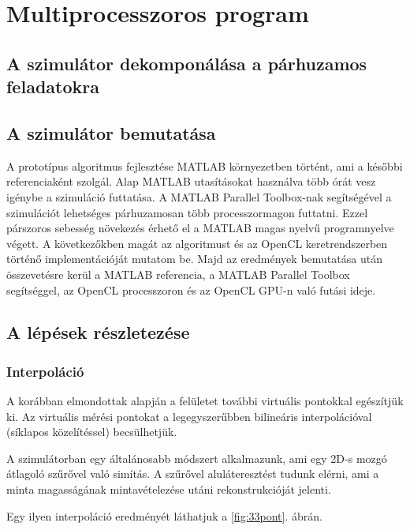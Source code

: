 \chapter{Multiprocesszoros program}
\section{A szimulátor dekomponálása a párhuzamos feladatokra}

\section{A szimulátor bemutatása} 
	 A prototípus algoritmus fejlesztése MATLAB környezetben történt, ami a későbbi referenciaként szolgál.
	 Alap MATLAB utasításokat használva több órát vesz igénybe a szimuláció futtatása.
	 A MATLAB Parallel Toolbox-nak segítségével a szimulációt lehetséges párhuzamosan több processzormagon futtatni.
	 Ezzel párszoros sebesség növekezés érhető el a MATLAB magas nyelvű programnyelve végett.
	 A következőkben magát az algoritmust és az OpenCL keretrendszerben történő implementációját mutatom be.
	 Majd az eredmények bemutatása után összevetésre kerül a MATLAB referencia, a MATLAB Parallel Toolbox segítséggel,
	 az OpenCL processzoron és az OpenCL GPU-n való futási ideje.
	
\section{A lépések részletezése} 
\subsection{Interpoláció}
	A korábban elmondottak alapján a felületet további virtuális pontokkal egészítjük ki.
	Az virtuális mérési pontokat a legegyszerűbben bilineáris interpolációval (síklapos közelítéssel) becsülhetjük.
	\begin{changebar}
	A szimulátorban egy általánosabb módszert alkalmazunk, ami egy 2D-s mozgó átlagoló szűrővel való simítás.
	A szűrővel aluláteresztést tudunk elérni, ami a minta magasságának mintavételezése utáni rekonstrukcióját jelenti.
	\end{changebar}
	Egy ilyen interpoláció eredményét láthatjuk a \ref{fig:33pont}. ábrán.
	
